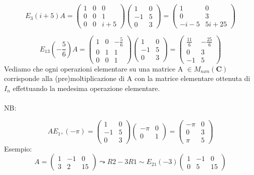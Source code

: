 \documentclass[12pt]{article}
\begin{document}
\[E_3(i+5)A = \begin{pmatrix}
    1 & 0 & 0\\
    0 & 0 & 1\\
    0 & 0 & i+5
\end{pmatrix}
\begin{pmatrix}
    1 & 0\\
    -1 & 5\\
    0 & 3
\end{pmatrix} =
\begin{pmatrix}
    1 & 0\\
    0 & 3\\
    -i-5 & 5i+25
\end{pmatrix}
\]

\[E_{13}\left(-\frac{5}{6}\right)A =
\begin{pmatrix}
    1 & 0 & -\frac{5}{6}\\
    0 & 1 & 1\\
    0 & 0 & 1
\end{pmatrix}
\begin{pmatrix}
    1 & 0\\
    -1 & 5\\
    0 & 3
\end{pmatrix} =
\begin{pmatrix}
    \frac{11}{6} & -\frac{25}{6}\\
    0 & 3\\
    -1 & 5
\end{pmatrix}
\]
Vediamo che ogni operazioni elementare su una matrice A $\in M_{nxn} (\mathbf{C})$ corrisponde alla  (pre)moltiplicazione di A con la matrice elementare ottenuta di $I_n$ effettuando la medesima operazione elementare.
\\\\
NB:

\[AE_1, (-\pi) = \begin{pmatrix}
    1 & 0\\
    -1 & 5\\
    0 & 3
\end{pmatrix}
\begin{pmatrix}
    -\pi & 0\\
    0 & 1
\end{pmatrix} =
\begin{pmatrix}
    -\pi & 0\\
    0 & 3\\
    \pi & 5
\end{pmatrix}
\]
Esempio:
\[A = \begin{pmatrix}
    1 & -1 & 0\\
    3 & 2 & 15
\end{pmatrix} \leadsto R2 - 3R1 \sim E_{21}(-3)
\begin{pmatrix}
    1 & -1 & 0\\
    0 & 5 & 15
\end{pmatrix}
\]
\end{document}
